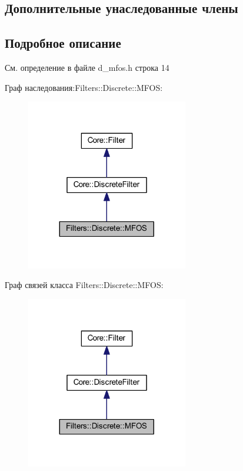 \subsection*{Дополнительные унаследованные члены}


\subsection{Подробное описание}


См. определение в файле d\+\_\+mfos.\+h строка 14



Граф наследования\+:Filters\+:\+:Discrete\+:\+:M\+F\+OS\+:\nopagebreak
\begin{figure}[H]
\begin{center}
\leavevmode
\includegraphics[width=200pt]{class_filters_1_1_discrete_1_1_m_f_o_s__inherit__graph}
\end{center}
\end{figure}


Граф связей класса Filters\+:\+:Discrete\+:\+:M\+F\+OS\+:\nopagebreak
\begin{figure}[H]
\begin{center}
\leavevmode
\includegraphics[width=200pt]{class_filters_1_1_discrete_1_1_m_f_o_s__coll__graph}
\end{center}
\end{figure}


